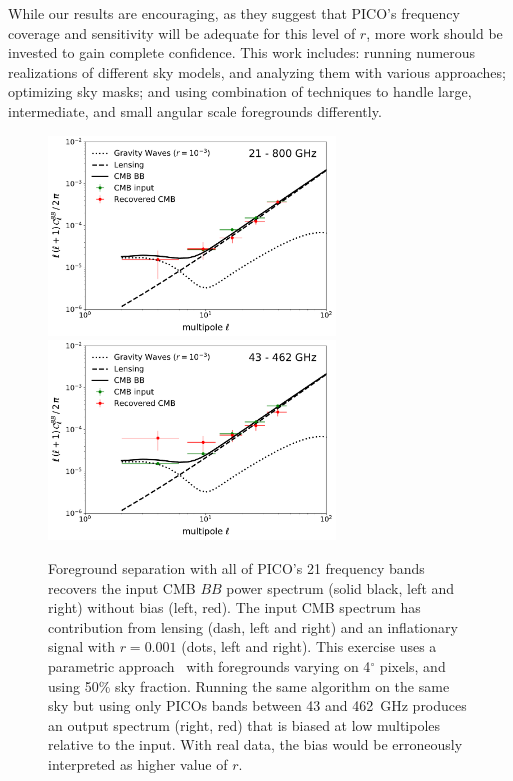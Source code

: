 \documentclass[PICOReport.tex]{subfiles}
\begin{document}
While our results are encouraging, as they suggest that PICO's frequency coverage and sensitivity will be adequate for this level of $r$, more work should be invested to gain complete confidence. This work includes: running numerous realizations of different sky models, and analyzing them with various approaches; optimizing sky masks; and using combination of techniques to handle large, intermediate, and small angular scale foregrounds differently. 
\begin{figure}
\includegraphics[width=3in]{images/commander_pico_baseline.pdf}
\hspace{-0.0in}
\includegraphics[width=3in]{images/commander_pico_descoped.pdf}
\caption{\captiontext
Foreground separation with all of PICO's 21 frequency bands recovers the input CMB $BB$ power spectrum (solid black, left and right) without bias (left, red). The input CMB spectrum has contribution from lensing (dash, left and right) and an inflationary signal with $r=0.001$ (dots, left and right). This exercise uses a parametric approach~\citep{eriksen/etal:2008} with foregrounds varying on 4$^\circ$ pixels, and using 50\% sky fraction. Running the same algorithm on the same sky but using only PICOs bands between 43 and 462~GHz produces an output spectrum (right, red) that is biased at low multipoles relative to the input. With real data, the bias would be erroneously interpreted as higher value of $r$. 
\label{fig:commander}}
\vspace{-0.0in}
\end{figure}
\end{document}
